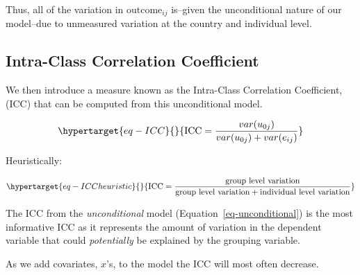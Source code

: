 \documentclass[
  letterpaper,
  DIV=11,
  numbers=noendperiod]{scrreprt}
\begin{document}
Thus, all of the variation in \(\text{outcome}_{ij}\) is--given the
unconditional nature of our model--due to unmeasured variation at the
country and individual level.

\hypertarget{intra-class-correlation-coefficient}{%
\subsection{Intra-Class Correlation
Coefficient}\label{intra-class-correlation-coefficient}}

We then introduce a measure known as the Intra-Class Correlation
Coefficient, (ICC) that can be computed from this unconditional model.

\begin{equation}\protect\hypertarget{eq-ICC}{}{\text{ICC} = \frac{var(u_{0j})}{var(u_{0j}) + var(e_{ij})}}\label{eq-ICC}\end{equation}

Heuristically:

\begin{equation}\protect\hypertarget{eq-ICCheuristic}{}{\text{ICC} = \frac{\text{group level variation}}{\text{group level variation} + \text{individual level variation}}}\label{eq-ICCheuristic}\end{equation}

The ICC from the \emph{unconditional} model
(Equation~\ref{eq-unconditional}) is the most informative ICC as it
represents the amount of variation in the dependent variable that could
\emph{potentially} be explained by the grouping variable.

As we add covariates, \(x\)'s, to the model the ICC will most often
decrease.
\end{document}
